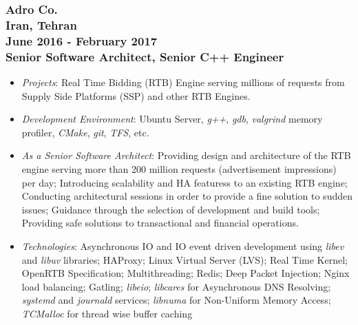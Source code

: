 \documentclass[10pt,a4paper]{article}
\begin{document}
\subsubsection{{\large Adro Co.} \\ 
\textnormal{Iran, Tehran} \\ 
\textnormal{June 2016 - February 2017} \\ 
{Senior Software Architect, Senior C++ Engineer}}
  \setlength{\leftskip}{0.5cm}
  \setlength{\rightskip}{1cm}
  \begin{itemize}
    \setlength{\rightskip}{1cm}
    \setlength\itemsep{0em}
    \item \small \textit {Projects}: Real Time Bidding (RTB) Engine serving millions of requests from Supply Side Platforms (SSP) and other RTB Engines.
    \item \small \textit {Development Environment}: Ubuntu Server, \textit{g++}, \textit{gdb}, \textit{valgrind} memory profiler, \textit{CMake}, \textit{git}, \textit{TFS}, etc.
    \item \small \textit {As a Senior Software Architect}: Providing design and architecture of the RTB engine serving more than 200 million requests (advertisement impressions) per day; Introducing scalability and HA featuress to an existing RTB engine; Conducting architectural sessions in order to provide a fine solution to sudden issues; Guidance through the selection of development and build tools; Providing safe solutions to transactional and financial operations.
    \item \small \textit {Technologies}: Asynchronous IO and IO event driven development using \textit{libev} and \textit{libuv} libraries; HAProxy; Linux Virtual Server (LVS); Real Time Kernel; OpenRTB Specification; Multithreading; Redis; Deep Packet Injection; Nginx load balancing; Gatling; \textit{libeio}; \textit{libcares} for Asynchronous DNS Resolving; \textit{systemd} and \textit{journald} services; \textit{libnuma} for Non-Uniform Memory Access; \textit{TCMalloc} for thread wise buffer caching 
  \end{itemize}
  \setlength{\leftskip}{0pt}
  \setlength{\rightskip}{0cm}
  
\end{document}
